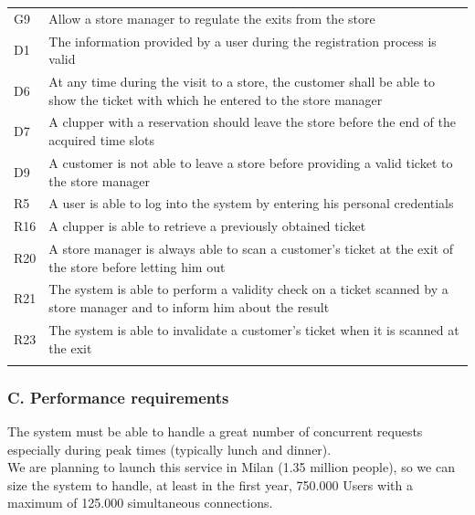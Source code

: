 \documentclass[
]{article}
\begin{document}
\begin{longtable}[]{@{}
  >{\raggedright\arraybackslash}p{}
  >{\raggedright\arraybackslash}p{}@{}}
\toprule
G9 & Allow a store manager to regulate the exits from the
store \\ \addlinespace
\midrule
\endhead
D1 & The information provided by a user during the registration process
is valid \\ \addlinespace
D6 & At any time during the visit to a store, the customer shall be able
to show the ticket with which he entered to the store
manager \\ \addlinespace
D7 & A clupper with a reservation should leave the store before the end
of the acquired time slots \\ \addlinespace
D9 & A customer is not able to leave a store before providing a valid
ticket to the store manager \\ \addlinespace
R5 & A user is able to log into the system by entering his personal
credentials \\ \addlinespace
R16 & A clupper is able to retrieve a previously obtained
ticket \\ \addlinespace
R20 & A store manager is always able to scan a customer's ticket at the
exit of the store before letting him out \\ \addlinespace
R21 & The system is able to perform a validity check on a ticket scanned
by a store manager and to inform him about the result \\ \addlinespace
R23 & The system is able to invalidate a customer's ticket when it is
scanned at the exit \\ \addlinespace
\bottomrule
\end{longtable}

\hypertarget{c.-performance-requirements}{%
\subsubsection{C. Performance
requirements}\label{c.-performance-requirements}}

The system must be able to handle a great number of concurrent requests
especially during peak times (typically lunch and dinner).\\
We are planning to launch this service in Milan (1.35 million people),
so we can size the system to handle, at least in the first year, 750.000
Users with a maximum of 125.000 simultaneous connections.
\end{document}
